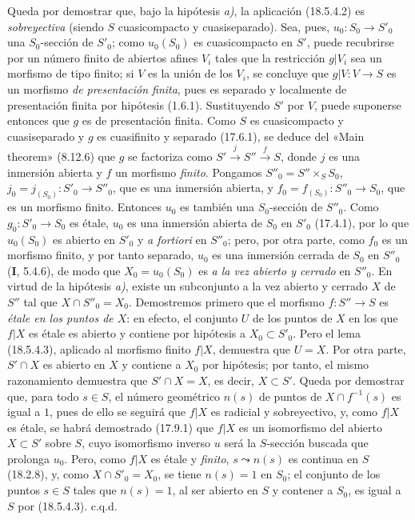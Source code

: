 Queda por demostrar que, bajo la hipótesis \emph{a)}, la aplicación (18.5.4.2) es \emph{sobreyectiva} (siendo $S$ cuasicompacto y cuasiseparado). Sea, pues, $u_0:S_0\to S'_0$ una $S_0$-sección de $S'_0$; como $u_0(S_0)$ es cuasicompacto en $S'$, puede recubrirse por un número finito de abiertos afines $V_i$ tales que la restricción $g|V_i$ sea un morfismo de tipo finito; si $V$ es la unión de los $V_i$, se concluye que $g|V:V\to S$ es un morfismo \emph{de presentación finita}, pues es separado y localmente de presentación finita por hipótesis (1.6.1). Sustituyendo $S'$ por $V$, puede suponerse entonces que $g$ es de presentación finita. Como $S$ es cuasicompacto y cuasiseparado y $g$ es cuasifinito y separado (17.6.1), se deduce del «Main theorem» (8.12.6) que $g$ se factoriza como $S'\xrightarrow{j}S''\xrightarrow{f}S$, donde $j$ es una inmersión abierta y $f$ un morfismo \emph{finito}. Pongamos $S''_0=S''\times_S S_0$, $j_0=j_{(S_0)}:S'_0\to S''_0$, que es una inmersión abierta, y $f_0=f_{(S_0)}:S''_0\to S_0$, que es un morfismo finito. Entonces $u_0$ es también una $S_0$-sección de $S''_0$. Como $g_0:S'_0\to S_0$ es étale, $u_0$ es una inmersión abierta de $S_0$ en $S'_0$ (17.4.1), por lo que $u_0(S_0)$ es abierto en $S'_0$ y \emph{a fortiori} en $S''_0$; pero, por otra parte, como $f_0$ es un morfismo finito, y por tanto separado, $u_0$ es una inmersión cerrada de $S_0$ en $S''_0$ (\textbf I, 5.4.6), de modo que $X_0=u_0(S_0)$ es \emph{a la vez abierto y cerrado} en $S''_0$. En virtud de la hipótesis \emph{a)}, existe un subconjunto a la vez abierto y cerrado $X$ de $S''$ tal que $X\cap S''_0=X_0$. Demostremos primero que el morfismo $f:S''\to S$ es \emph{étale en los puntos de $X$}: en efecto, el conjunto $U$ de los puntos de $X$ en los que $f|X$ es étale es abierto y contiene por hipótesis a $X_0\subset S'_0$. Pero el lema (18.5.4.3), aplicado al morfismo finito $f|X$, demuestra que $U=X$. Por otra parte, $S'\cap X$ es abierto en $X$ y contiene a $X_0$ por hipótesis; por tanto, el mismo razonamiento demuestra que $S'\cap X=X$, es decir, $X\subset S'$. Queda por demostrar que, para todo $s\in S$, el número geométrico $n(s)$ de puntos de $X\cap f^{-1}(s)$ es igual a $1$, pues de ello se seguirá que $f|X$ es radicial y sobreyectivo, y, como $f|X$ es étale, se habrá demostrado (17.9.1) que $f|X$ es un isomorfismo del abierto $X\subset S'$ sobre $S$, cuyo isomorfismo inverso $u$ será la $S$-sección buscada que prolonga $u_0$. Pero, como $f|X$ es étale y \emph{finito}, $s\leadsto n(s)$ es continua en $S$ (18.2.8), y, como $X\cap S'_0=X_0$, se tiene $n(s)=1$ en $S_0$; el conjunto de los puntos $s\in S$ tales que $n(s)=1$, al ser abierto en $S$ y contener a $S_0$, es igual a $S$ por (18.5.4.3). c.q.d.

